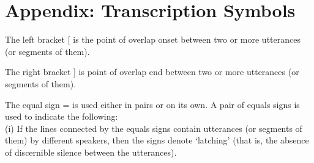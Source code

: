 \documentclass[output=paper]{LSP/langsci}
\begin{document}
\section*{Appendix: Transcription Symbols}
\begin{description}
\item 	The left bracket [ is the point of overlap onset between two or more utterances (or segments of them).
\item  The right bracket ] is point of overlap end between two or more utterances (or segments of them).
\item   The equal sign = is used either in pairs or on its own. A pair of equals signs is used to indicate the following:\\
(i) If the lines connected by the equals signs contain utterances (or segments of them) by different speakers, then the signs denote `latching' (that is, the absence of discernible silence between the utterances). 


\end{description}
\end{document}
